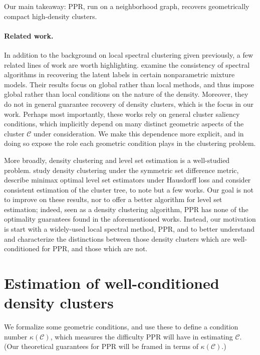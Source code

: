 \documentclass{article}
\newcommand{\1}{\mathbf{1}}
\newcommand{\Cset}{\mathcal{C}}
\theoremstyle{aldenthm}
\theoremstyle{aldenrmrk}
\begin{document}
Our main takeaway: PPR, run on a neighborhood graph, recovers geometrically
compact high-density clusters. 

\paragraph{Related work.} In addition to the background on local spectral
clustering given previously, a few related lines of work are worth
highlighting. \citep{shi2009,schiebinger2015} examine the consistency of  
spectral algorithms in recovering the latent labels in certain
nonparametric mixture models. Their results focus on global rather than local 
methods, and thus impose global rather than local conditions on the nature
of the density. Moreover, they do not in general guarantee recovery of density 
clusters, which is the focus in our work. Perhaps most importantly, these works
rely on general cluster saliency conditions, which implicitly depend on many
distinct geometric aspects of the cluster $\Cset$ under consideration. We make
this dependence more explicit, and in doing so expose the role each geometric
condition plays in the clustering problem. 

More broadly, density clustering and level set estimation is a well-studied
problem. \citet{polonik1995, rigollet2009} study density clustering under the 
symmetric set difference metric, \citet{tsybakov1997, singh2009} describe
minimax optimal level set estimators under Hausdorff loss and
\citet{hartigan1981, chaudhuri2010} consider consistent estimation of the
cluster tree, to note but a few works. Our goal is not to improve on these
results, nor to offer a better algorithm for level set estimation; indeed, seen as
a density clustering algorithm, PPR has none of the optimality guarantees 
found in the aforementioned works. Instead, our motivation is start with a
widely-used local spectral method, PPR, and to better understand and
characterize the distinctions between those density clusters which are
well-conditioned for PPR, and those which are not. 

\section{Estimation of well-conditioned density clusters}
\label{sec: consistent_cluster_estimation_with_ppr}

We formalize some geometric conditions, and use these to define a condition
number $\kappa(\Cset)$, which measures the difficulty PPR will have in  
estimating $\Cset$. (Our theoretical guarantees for PPR will be framed in terms 
of $\kappa(\Cset)$.)
\end{document}
